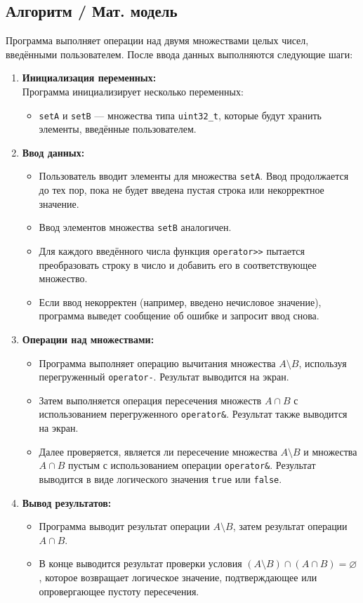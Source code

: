 \documentclass[14pt,a4paper]{article}
\begin{document}
\subsection{Алгоритм / Мат. модель}
Программа выполняет операции над двумя множествами целых чисел, введёнными пользователем. После ввода данных выполняются следующие шаги:
\begin{enumerate}
  \item \textbf{Инициализация переменных:}\\
    Программа инициализирует несколько переменных:
    \begin{itemize}
      \item \texttt{setA} и \texttt{setB} — множества типа \texttt{uint32\_t}, которые будут хранить элементы, введённые пользователем.
    \end{itemize}
  \item \textbf{Ввод данных:}
    \begin{itemize}
      \item Пользователь вводит элементы для множества \texttt{setA}. Ввод продолжается до тех пор, пока не будет введена пустая строка или некорректное значение.
      \item Ввод элементов множества \texttt{setB} аналогичен.
      \item Для каждого введённого числа функция \texttt{operator>>} пытается преобразовать строку в число и добавить его в соответствующее множество.
      \item Если ввод некорректен (например, введено нечисловое значение), программа выведет сообщение об ошибке и запросит ввод снова.
    \end{itemize}
  \item \textbf{Операции над множествами:}
    \begin{itemize}
      \item Программа выполняет операцию вычитания множества $A \setminus B$, используя перегруженный \texttt{operator-}. Результат выводится на экран.
      \item Затем выполняется операция пересечения множеств $A \cap B$ с использованием перегруженного \texttt{operator\&}. Результат также выводится на экран.
      \item Далее проверяется, является ли пересечение множества $A \setminus B$ и множества $A \cap B$ пустым с использованием операции \texttt{operator\&}. Результат выводится в виде логического значения \texttt{true} или \texttt{false}.
    \end{itemize}
  \item \textbf{Вывод результатов:}
    \begin{itemize}
      \item Программа выводит результат операции $A \setminus B$, затем результат операции $A \cap B$.
      \item В конце выводится результат проверки условия $(A \setminus B) \cap (A \cap B) = \varnothing$, которое возвращает логическое значение, подтверждающее или опровергающее пустоту пересечения.
    \end{itemize}
\end{enumerate}
\end{document}

